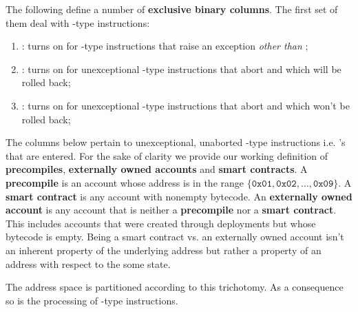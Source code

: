 The following define a number of \textbf{exclusive binary columns}.
The first set of them deal with -type instructions:
\begin{enumerate}
	\item \scenCallException:
		turns on for -type instructions that raise an exception \emph{other than} \suxSH{};
	\item \scenCallAbortWillRevert:
		turns on for unexceptional -type instructions that abort and which will be rolled back;
	\item \scenCallAbortWontRevert:
		turns on for unexceptional -type instructions that abort and which won't be rolled back;
\end{enumerate}
The columns below pertain to unexceptional, unaborted -type instructions i.e. 's that are entered. 
For the sake of clarity we provide our working definition of \textbf{precompiles}, \textbf{externally owned accounts} and \textbf{smart contracts}.
A \textbf{precompile} is an account whose address is in the range $\{\texttt{0x01},\texttt{0x02},\dots, \texttt{0x09}\}$.
A \textbf{smart contract} is any account with nonempty bytecode.
An \textbf{externally owned account} is any account that is neither a \textbf{precompile} nor a \textbf{smart contract}. 
This includes accounts that were created through deployments but whose bytecode is empty.
Being a smart contract vs. an externally owned account isn't an inherent property of the underlying address but rather a property of an address with respect to the some state. 

\saNote{} The address space is partitioned according to this trichotomy. As a consequence so is the processing of -type instructions.


